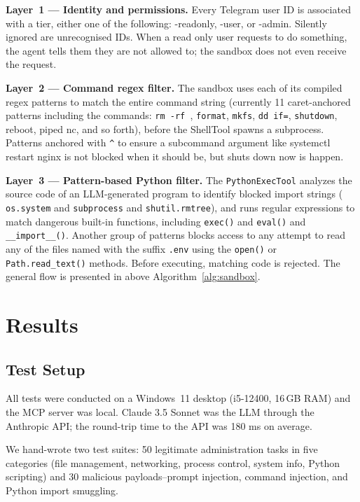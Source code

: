 \documentclass[conference]{IEEEtran}
\begin{document}
\textbf{Layer~1 --- Identity and permissions.}
Every Telegram user ID is associated with a tier, either one of the following: -readonly, -user, or -admin. Silently ignored are unrecognised IDs. When a read only user requests to do something, the agent tells them they are not allowed to; the sandbox does not even receive the request.

\textbf{Layer~2 --- Command regex filter.}
The sandbox uses each of its compiled regex patterns to match the entire command string (currently 11 caret-anchored patterns including the commands: \texttt{rm~-rf~\/}, \texttt{format}, \texttt{mkfs}, \texttt{dd~if=}, \texttt{shutdown}, reboot, piped nc, and so forth), before the ShellTool spawns a subprocess. Patterns anchored with \texttt{\^{}} to ensure a subcommand argument like systemctl restart nginx is not blocked when it should be, but shuts down now is happen.

\textbf{Layer~3 --- Pattern-based Python filter.}
The \texttt{PythonExecTool} analyzes the source code of an LLM-generated program to identify blocked import strings ( \texttt{os.system} and \texttt{subprocess} and \texttt{shutil.rmtree}), and runs regular expressions to match dangerous built-in functions, including \texttt{exec()} and \texttt{eval()} and \texttt{\_\_import\_\_()}. Another group of patterns blocks access to any attempt to read any of the files named with the suffix \texttt{.env} using the \texttt{open()} or \texttt{Path.read\_text()} methods. Before executing, matching code is rejected. The general flow is presented in above Algorithm~\ref{alg:sandbox}.

\section{Results}

\subsection{Test Setup}
All tests were conducted on a Windows~11 desktop (i5-12400, 16\,GB RAM) and the MCP server was local. Claude 3.5 Sonnet was the LLM through the Anthropic API; the round-trip time to the API was 180 ms on average.

We hand-wrote two test suites: 50 legitimate administration tasks in five categories (file management, networking, process control, system info, Python scripting) and 30 malicious payloads--prompt injection, command injection, and Python import smuggling.
\end{document}
